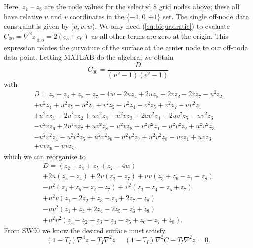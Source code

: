 \documentclass[12pt,letterpaper,margin=0.5in]{article}
\begin{document}
Here, $z_1$ -- $z_8$ are the node values for the selected 8 grid nodes above;
these all have relative $u$ and $v$ coordinates in the \{$-1, 0, +1$\} set.
The single off-node data constraint is given by ($u,v,w$).  We only need
(\ref{eq:biquadratic}) to evaluate $C_{00} = \nabla^2 z \rvert _{0, 0} = 2 \left(c_5 + c_6 \right)$
as all other terms are zero at the origin.  This expression relates the curvature of the
surface at the center node to our off-node data point.  Letting MATLAB do the algebra,
we obtain
\begin{equation}
C_{00} = \frac{D}{(u^2-1)(v^2-1)}
\label{eq:biquad}
\end{equation}
with
\begin{equation}
\begin{split}
D = z_2 + z_4 + z_5 + z_7 - 4w - 2u z_4 + 2 u z_5 + 2 v z_2 - 2 v z_7 - u^2 z_2   \\
    + u^2 z_4 + u^2 z_5 - u^2 z_7 + v^2 z_2 - v^2 z_4 - v^2 z_5 + v^2 z_7 - u v^2 z_1    \\
    + u^2 v z_1 - 2 u^2 v z_2 + u v^2 z_3 + u^2 v z_3 + 2 u v^2 z_4 - 2 u v^2 z_5 - u v^2 z_6  \\
    - u^2 v z_6 + 2 u^2 v z_7 + u v^2 z_8 - u^2 v z_8 + u^2 v^2 z_1 - u^2 v^2 z_2 + u^2 v^2 z_3   \\
    - u^2 v^2 z_4 - u^2 v^2 z_5+ u^2 v^2 z_6 - u^2 v^2 z_7 + u^2 v^2 z_8 - u v z_1 + u v z_3 \\
    + u v z_6 - u v z_8.
\end{split}
\end{equation}
which we can reorganize to
\begin{equation}
\begin{split}
D = (z_2 + z_4 + z_5 + z_7 - 4w)   \\
	+ 2u (z_5 - z_4) + 2v (z_2 - z_7) + u v (z_3 + z_6 - z_1 - z_8) \\
	- u^2 (z_4 + z_5 - z_2 - z_7) + v^2 (z_2 - z_4 - z_5 + z_7)    \\
	+ u^2 v (z_1 - 2 z_2 + z_3 - z_6 + 2 z_7 - z_8) \\
	- u v^2 (z_1 + z_3 + 2 z_4 - 2 z_5 - z_6 + z_8)  \\
	+ u^2 v^2 (z_1 - z_2 + z_3 - z_4 - z_5 + z_6 - z_7 + z_8).
\end{split}
\end{equation}
From SW90 we know the desired surface must satisfy
\begin{equation}
\left( 1 - T_I\right)\nabla^4 z - T_I \nabla^2 z = \left( 1 - T_I\right)\nabla^2 C - T_I \nabla^2 z = 0.
\label{eq:biharm}
\end{equation}
\end{document}
